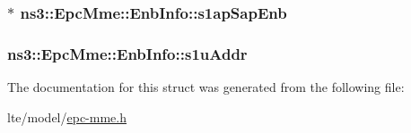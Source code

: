 \subsubsection[{\texorpdfstring{s1ap\+Sap\+Enb}{s1apSapEnb}}]{$\ast$ ns3\+::\+Epc\+Mme\+::\+Enb\+Info\+::s1ap\+Sap\+Enb}\hypertarget{structns3_1_1EpcMme_1_1EnbInfo_a0e7b8da423e29e057cefbc77a2db759f}{}\label{structns3_1_1EpcMme_1_1EnbInfo_a0e7b8da423e29e057cefbc77a2db759f}
\subsubsection[{\texorpdfstring{s1u\+Addr}{s1uAddr}}]{ ns3\+::\+Epc\+Mme\+::\+Enb\+Info\+::s1u\+Addr}\hypertarget{structns3_1_1EpcMme_1_1EnbInfo_aa3544a110469530c6366c49ebb3eebf9}{}\label{structns3_1_1EpcMme_1_1EnbInfo_aa3544a110469530c6366c49ebb3eebf9}


The documentation for this struct was generated from the following file\+:\begin{DoxyCompactItemize}
\item 
lte/model/\hyperlink{epc-mme_8h}{epc-\/mme.\+h}\end{DoxyCompactItemize}
